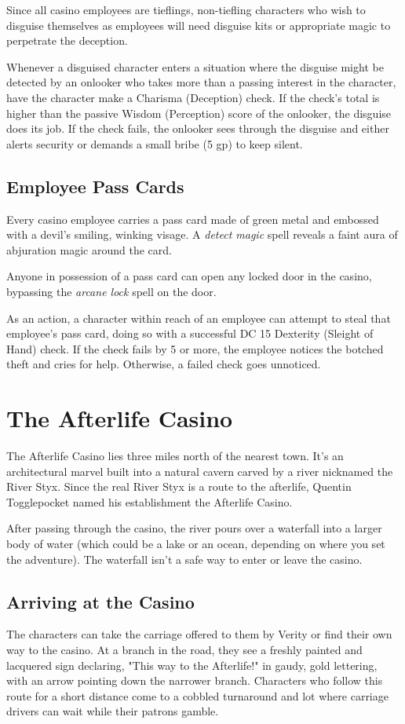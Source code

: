 \documentclass[10pt,a4paper,twoside,bg=print,twocolumn,openany,nodeprecatedcode]{dndbook}
\begin{document}
Since all casino employees are tieflings, non-tiefling characters who wish to disguise themselves as employees will need disguise kits or appropriate magic to perpetrate the deception.

Whenever a disguised character enters a situation where the disguise might be detected by an onlooker who takes more than a passing interest in the character, have the character make a Charisma (Deception) check. If the check's total is higher than the passive Wisdom (Perception) score of the onlooker, the disguise does its job. If the check fails, the onlooker sees through the disguise and either alerts security or demands a small bribe (5 gp) to keep silent.

\subsection{Employee Pass Cards}
Every casino employee carries a pass card made of green metal and embossed with a devil's smiling, winking visage. A \textit{detect magic} spell reveals a faint aura of abjuration magic around the card.

Anyone in possession of a pass card can open any locked door in the casino, bypassing the \textit{arcane lock} spell on the door.

As an action, a character within reach of an employee can attempt to steal that employee's pass card, doing so with a successful DC 15 Dexterity (Sleight of Hand) check. If the check fails by 5 or more, the employee notices the botched theft and cries for help. Otherwise, a failed check goes unnoticed.

\section{The Afterlife Casino}
The Afterlife Casino lies three miles north of the nearest town. It's an architectural marvel built into a natural cavern carved by a river nicknamed the River Styx. Since the real River Styx is a route to the afterlife, Quentin Togglepocket named his establishment the Afterlife Casino.

After passing through the casino, the river pours over a waterfall into a larger body of water (which could be a lake or an ocean, depending on where you set the adventure). The waterfall isn't a safe way to enter or leave the casino.

\subsection{Arriving at the Casino}
The characters can take the carriage offered to them by Verity or find their own way to the casino. At a branch in the road, they see a freshly painted and lacquered sign declaring, "This way to the Afterlife!" in gaudy, gold lettering, with an arrow pointing down the narrower branch. Characters who follow this route for a short distance come to a cobbled turnaround and lot where carriage drivers can wait while their patrons gamble.
\end{document}
